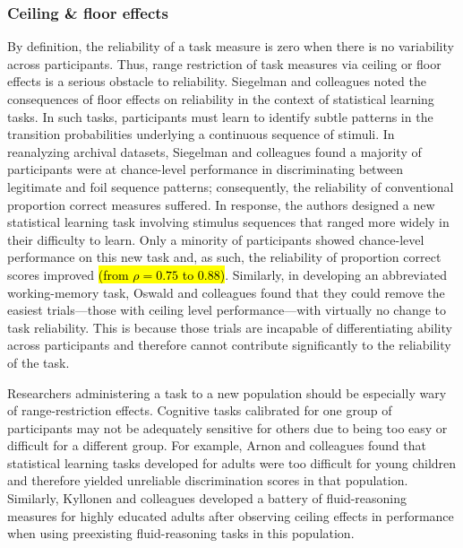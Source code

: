 \documentclass[a4paper,12pt]{article}
\begin{document}
\subsubsection{Ceiling \& floor effects}

By definition, the reliability of a task measure is zero when there is no variability across participants. Thus, range restriction of task measures via ceiling or floor effects is a serious obstacle to reliability. Siegelman and colleagues \cite{siegelman2017measuring} noted the consequences of floor effects on reliability in the context of statistical learning tasks. In such tasks, participants must learn to identify subtle patterns in the transition probabilities underlying a continuous sequence of stimuli. In reanalyzing archival datasets, Siegelman and colleagues found a majority of participants were at chance-level performance in discriminating between legitimate and foil sequence patterns; consequently, the reliability of conventional proportion correct measures suffered. In response, the authors designed a new statistical learning task involving stimulus sequences that ranged more widely in their difficulty to learn. Only a minority of participants showed chance-level performance on this new task and, as such, the reliability of proportion correct scores improved \hl{(from $\rho = 0.75$ to $0.88$)}. Similarly, in developing an abbreviated working-memory task, Oswald and colleagues \cite{oswald2015development} found that they could remove the easiest trials---those with ceiling level performance---with virtually no change to task reliability. This is because those trials are incapable of differentiating ability across participants and therefore cannot contribute significantly to the reliability of the task.

Researchers administering a task to a new population should be especially wary of range-restriction effects. Cognitive tasks calibrated for one group of participants may not be adequately sensitive for others due to being too easy or difficult for a different group. For example, Arnon and colleagues \cite{arnon2020current} found that statistical learning tasks developed for adults were too difficult for young children and therefore yielded unreliable discrimination scores in that population. Similarly, Kyllonen and colleagues \cite{kyllonen2019general} developed a battery of fluid-reasoning measures for highly educated adults after observing ceiling effects in performance when using preexisting fluid-reasoning tasks in this population.  
\end{document}
